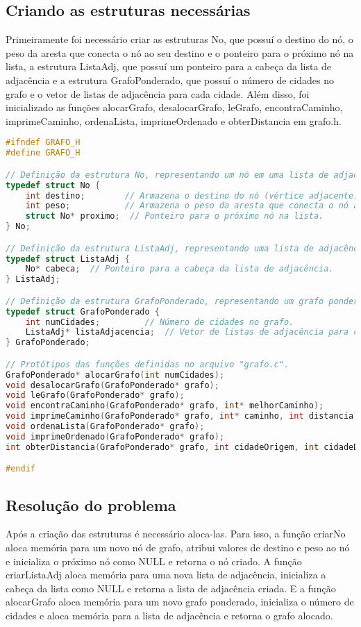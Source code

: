 \documentclass{article}
\begin{document}
\subsection{Criando as estruturas necessárias}
 Primeiramente foi necessário criar as estruturas No, que possuí o destino do nó, o peso da aresta que conecta o nó ao seu destino e o ponteiro para o próximo nó na lista, a estrutura  ListaAdj, que possuí um ponteiro para a cabeça da lista de adjacência e a estrutura GrafoPonderado, que possuí o número de cidades no grafo e o vetor de listas de adjacência para cada cidade. Além disso, foi inicializado as funções alocarGrafo, desalocarGrafo, leGrafo, encontraCaminho, imprimeCaminho, ordenaLista, imprimeOrdenado e obterDistancia em grafo.h.
\begin{lstlisting}[caption={grafo.h},label={lst:cod1},language=C]
#ifndef GRAFO_H
#define GRAFO_H

// Definição da estrutura No, representando um nó em uma lista de adjacência.
typedef struct No {
    int destino;        // Armazena o destino do nó (vértice adjacente).
    int peso;           // Armazena o peso da aresta que conecta o nó ao seu destino.
    struct No* proximo;  // Ponteiro para o próximo nó na lista.
} No;

// Definição da estrutura ListaAdj, representando uma lista de adjacência para um vértice em um grafo ponderado.
typedef struct ListaAdj {
    No* cabeca;  // Ponteiro para a cabeça da lista de adjacência.
} ListaAdj;

// Definição da estrutura GrafoPonderado, representando um grafo ponderado.
typedef struct GrafoPonderado {
    int numCidades;         // Número de cidades no grafo.
    ListaAdj* listaAdjacencia;  // Vetor de listas de adjacência para cada cidade.
} GrafoPonderado;

// Protótipos das funções definidas no arquivo "grafo.c".
GrafoPonderado* alocarGrafo(int numCidades);
void desalocarGrafo(GrafoPonderado* grafo);
void leGrafo(GrafoPonderado* grafo);
void encontraCaminho(GrafoPonderado* grafo, int* melhorCaminho);
void imprimeCaminho(GrafoPonderado* grafo, int* caminho, int distancia);
void ordenaLista(GrafoPonderado* grafo);
void imprimeOrdenado(GrafoPonderado* grafo);
int obterDistancia(GrafoPonderado* grafo, int cidadeOrigem, int cidadeDestino);

#endif

\end{lstlisting}
\subsection{Resolução do problema}
Após a criação das estruturas é necessário aloca-las. Para isso, a função criarNo aloca memória para um novo nó de grafo, atribui valores de destino e peso ao nó e inicializa o próximo nó como NULL e retorna o nó criado. A função criarListaAdj aloca memória para uma nova lista de adjacência, inicializa a cabeça da lista como NULL e retorna a lista de adjacência criada. E a função alocarGrafo aloca memória para um novo grafo ponderado, inicializa o número de cidades e aloca memória para a lista de adjacência e retorna o grafo alocado.
\end{document}
